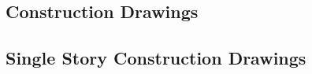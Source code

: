 \documentclass{article}
\begin{document}
\begin{appendices}
%
%
%
%
%
%
%
%
%
%
%
%

\clearpage

\section{Construction Drawings} \label{App:ConstructionDrawings}

\clearpage

\subsection{Single Story Construction Drawings}


\end{appendices}
\end{document}
